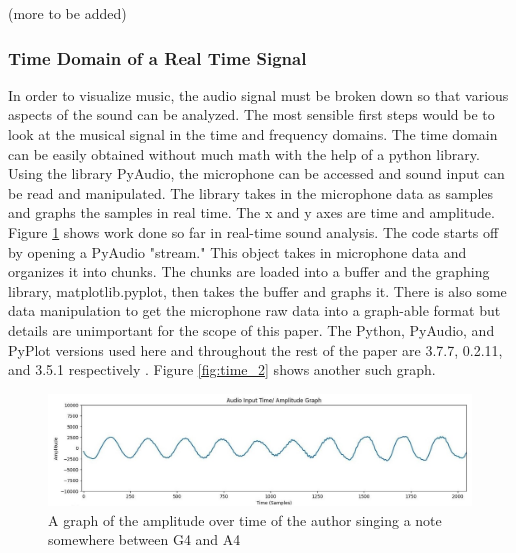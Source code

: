 \documentclass[10pt]{article}
\begin{document}
\noindent(more to be added)




\subsubsection{Time Domain of a Real Time Signal}
\hspace{\parindent} In order to visualize music, the audio signal must be broken down so that various aspects of the sound can be analyzed. The most sensible first steps would be to look at the musical signal in the time and frequency domains. The time domain can be easily obtained without much math with the help of a python library. Using the library PyAudio, the microphone can be accessed and sound input can be read and manipulated. The library takes in the microphone data as samples and graphs the samples in real time. The x and y axes are time and amplitude. Figure \ref{fig:time_1} shows work done so far in real-time sound analysis. The code starts off by opening a PyAudio "stream." This object takes in microphone data and organizes it into chunks. The chunks are loaded into a buffer and the graphing library, matplotlib.pyplot, then takes the buffer and graphs it. There is also some data manipulation to get the microphone raw data into a graph-able format but details are unimportant for the scope of this paper. The Python, PyAudio, and PyPlot versions used here and throughout the rest of the paper are 3.7.7, 0.2.11, and 3.5.1 respectively \cite{hunter2007pyplot} \cite{pyaudio} \cite{python}. Figure \ref{fig:time_2} shows another such graph.

\begin{figure}[H]
    \centering
    \includegraphics[width=1.05\textwidth]{Alan_1}
    \caption{A graph of the amplitude over time of the author singing a note somewhere between G4 and A4 \cite{noteFrequencies}}
    \label{fig:time_1}
\end{figure}
\end{document}
